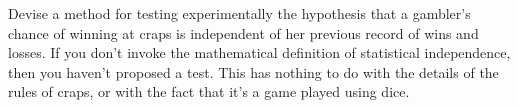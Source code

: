 Devise a method for testing experimentally the hypothesis
that a gambler's chance of winning at craps is independent
of her previous record of wins and losses. If you don't
invoke the mathematical definition of statistical independence, then you haven't
proposed a test. This has nothing to do with the details of the
rules of craps, or with the fact that it's a game played using dice.
